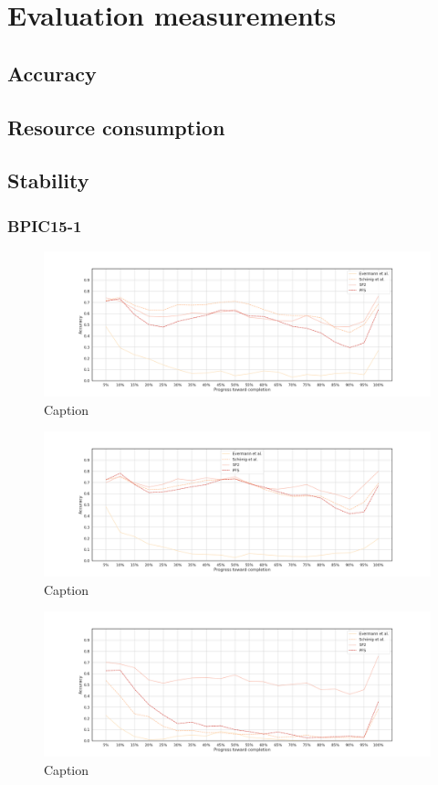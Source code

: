 \chapter{Evaluation measurements}
\section{Accuracy}
\section{Resource consumption}
\section{Stability}

\FloatBarrier
\subsection{BPIC15-1}
\begin{figure}[!htb]
    \centering
    \includegraphics[width=\textwidth]{gfx/stability/bpic2015_1/individual_stability.png}
    \caption{Caption}
    \label{fig:my_label}
\end{figure}
\begin{figure}[!htb]
    \centering
    \includegraphics[width=\textwidth]{gfx/stability/bpic2015_1/grouped_stability.png}
    \caption{Caption}
    \label{fig:my_label}
\end{figure}
\begin{figure}[!htb]
    \centering
    \includegraphics[width=\textwidth]{gfx/stability/bpic2015_1/padded_stability.png}
    \caption{Caption}
    \label{fig:my_label}
\end{figure}
